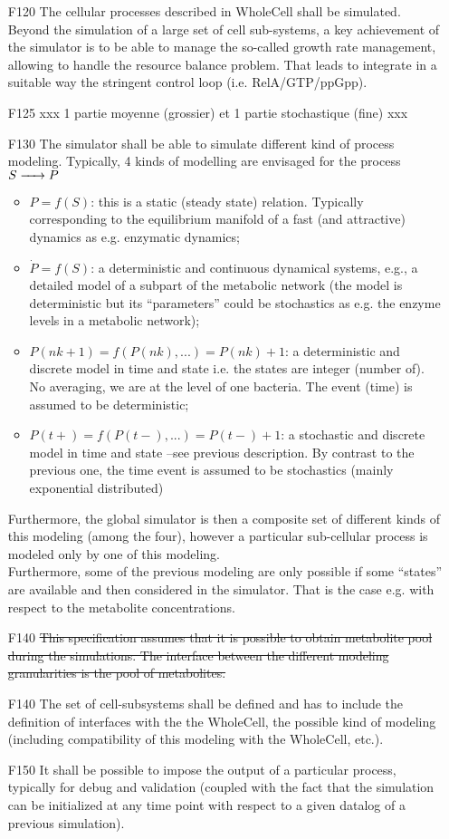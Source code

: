 \begin{enumerate}
  \item[F120] The cellular processes described in WholeCell shall be simulated. Beyond the simulation of a large set of cell sub-systems, a key achievement of the simulator is to be able to manage the so-called growth rate management, allowing to handle the resource balance problem. That leads to integrate in a suitable way the stringent control loop (i.e. RelA/GTP/ppGpp).
  \item[F125] xxx 1 partie moyenne (grossier) et 1 partie stochastique (fine) xxx
  \item[F130] The simulator shall be able to simulate different kind of process modeling. Typically, 4 kinds of modelling are envisaged for the process $S \ce{->} P$
  \begin{itemize}
    \item $P = f(S)$: this is a static (steady state) relation. Typically corresponding to the equilibrium manifold of a fast (and attractive) dynamics as e.g. enzymatic dynamics;
    \item $\dot{P} = f(S)$: a deterministic and continuous dynamical systems,  e.g., a detailed model of a subpart of the metabolic network (the model is deterministic but its “parameters” could be stochastics as e.g. the enzyme levels in a metabolic network);
    \item $P(nk+1) = f(P(nk),...) = P(nk)+1$: a deterministic and discrete model in time and state i.e.  the states are integer (number of). No averaging, we are at the level of one bacteria. The event (time) is assumed to be deterministic;
    \item $P(t+) = f(P(t-),...) = P(t-)+1$: a stochastic  and discrete model in time and state –see previous description.  By contrast to the previous one, the time event is assumed to be stochastics (mainly exponential distributed)
  \end{itemize}
      Furthermore, the global simulator is then  a composite set of different kinds of this modeling (among the four), however a particular sub-cellular process is modeled only by one of this modeling. \\
      Furthermore, some of the previous modeling are only possible if some “states” are available and then considered in the simulator. That is the case e.g. with respect to the metabolite concentrations.
  \item[F140] \sout{This specification assumes that it is possible to obtain metabolite pool during the simulations. The interface between the different modeling granularities is the pool of metabolites.}
  \item[F140] The set of cell-subsystems shall be defined and has to include the definition of interfaces with the the WholeCell, the possible kind of modeling (including compatibility of this modeling with the WholeCell, etc.).
  \item[F150] It shall be possible to impose the output of a particular process, typically for debug and validation (coupled with the fact that the simulation can be initialized at any time point with respect to a given  datalog of a previous simulation).
  \\


\end{enumerate}

